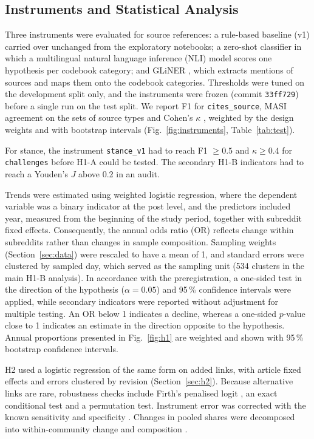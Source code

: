 \documentclass[10pt,a4paper]{article}
\newcommand{\kod}[1]{\texttt{#1}}
\begin{document}
\subsection{Instruments and Statistical Analysis}
\label{sec:instruments}
Three instruments were evaluated for source references: a rule-based baseline (v1) carried
over unchanged from the exploratory notebooks; a zero-shot classifier in which a
multilingual natural language inference (NLI) model scores one hypothesis per codebook
category; and GLiNER \cite{zaratiana2024}, which extracts mentions of sources and maps them
onto the codebook categories. Thresholds were tuned on the development split only, and the
instruments were frozen (commit \kod{33ff729}) before a single run on the test split. We
report F1 for \kod{cites\_source}, MASI agreement on the sets of source types
\cite{passonneau2006} and Cohen's $\kappa$ \cite{cohen1960}, weighted by the design
weights and with bootstrap intervals (Fig.~\ref{fig:instruments}, Table~\ref{tab:test}).

For stance, the instrument \kod{stance\_v1} had to reach F1 $\geq 0.5$ and $\kappa \geq 0.4$
for \kod{challenges} before H1-A could be tested. The secondary H1-B indicators had to reach
a Youden's $J$ above 0.2 in an audit.

Trends were estimated using weighted logistic regression, where the dependent variable
was a binary indicator at the post level, and the predictors included year, measured from
the beginning of the study period, together with subreddit fixed effects. Consequently,
the annual odds ratio (OR) reflects change within subreddits rather than changes in sample
composition. Sampling weights (Section~\ref{sec:data}) were rescaled to have a mean of 1, and standard
errors were clustered by sampled day, which served as the sampling unit (534 clusters in
the main H1-B analysis). In accordance with the preregistration, a one-sided test in the
direction of the hypothesis ($\alpha = 0.05$) and 95\,\% confidence intervals were applied,
while secondary indicators were reported without adjustment for multiple testing.
An OR below 1 indicates a decline, whereas a one-sided $p$-value close to 1 indicates an
estimate in the direction opposite to the hypothesis. Annual proportions presented in
Fig.~\ref{fig:h1} are weighted and shown with 95\,\% bootstrap confidence intervals.

H2 used a logistic regression of the same form on added links, with article fixed effects
and errors clustered by revision (Section~\ref{sec:h2}). Because alternative links are rare,
robustness checks include Firth's penalised logit \cite{firth1993,heinze2002}, an exact
conditional test and a permutation test. Instrument error was corrected with the known
sensitivity and specificity \cite{rogan1978}. Changes in pooled shares were decomposed into
within-community change and composition \cite{kitagawa1955}.
\end{document}
